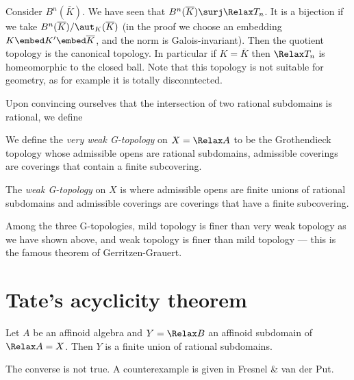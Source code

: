 \documentclass[a4paper]{article}
\let\Sp\Relax
\DeclareMathOperator{\Sp}{Sp} %
\begin{document}
\begin{eg}
  Consider \(B^n(\overline K)\). We have seen that \(B^n(\overline K) \surj \Sp T_n\). It is a bijection if we take \(B^n(\overline K)/\aut_K(\overline K)\) (in the proof we choose an embedding \(K \embed K' \embed \overline K\), and the norm is Galois-invariant). Then the quotient topology is the canonical topology. In particular if \(K = \overline K\) then \(\Sp T_n\) is homeomorphic to the closed ball. Note that this topology is not suitable for geometry, as for example it is totally disconntected.
\end{eg}

Upon convincing ourselves that the intersection of two rational subdomains is rational, we define

\begin{definition}
  We define the \emph{very weak G-topology} on \(X = \Sp A\) to be the Grothendieck topology whose admissible opens are rational subdomains, admissible coverings are coverings that contain a finite subcovering.

  The \emph{weak G-topology} on \(X\) is where admissible opens are finite unions of rational subdomains and admissible coverings are coverings that have a finite subcovering.
\end{definition}

Among the three G-topologies, mild topology is finer than very weak topology as we have shown above, and weak topology is finer than mild topology --- this is the famous theorem of Gerritzen-Grauert.

\section{Tate's acyclicity theorem}

\begin{theorem}
  Let \(A\) be an affinoid algebra and \(Y = \Sp B\) an affinoid subdomain of \(\Sp A = X\). Then \(Y\) is a finite union of rational subdomains.
\end{theorem}

\begin{note}
  The converse is not true. A counterexample is given in Fresnel \& van der Put.
\end{note}
\end{document}
